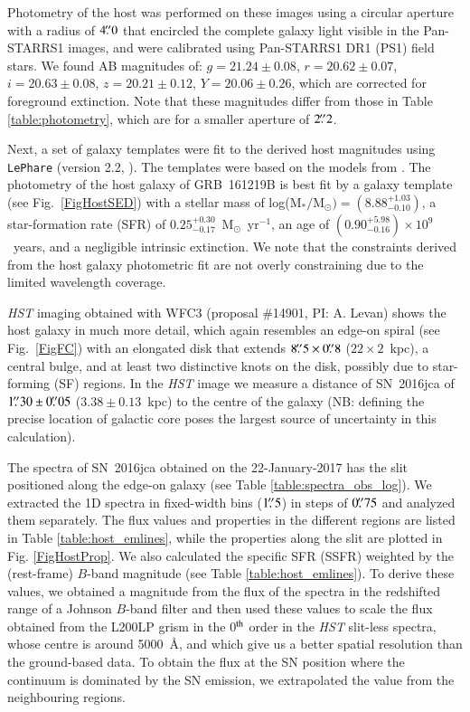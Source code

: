 \documentclass[traditabstract,longauth]{aa}
\begin{document}
Photometry of the host was performed on these images using a circular aperture with a radius of $4\hbox{$.\!\!^{\prime\prime}$}0$ that encircled the complete galaxy light visible in the Pan-STARRS1 images, and were calibrated using Pan-STARRS1 DR1 (PS1) field stars.  We found AB magnitudes of: $g = 21.24\pm0.08$, $r = 20.62\pm0.07$, $i = 20.63\pm0.08$, $z = 20.21\pm0.12$, $Y = 20.06\pm0.26$, which are corrected for foreground extinction.  Note that these magnitudes differ from those in Table \ref{table:photometry}, which are for a smaller aperture of $2\hbox{$.\!\!^{\prime\prime}$}2$.

Next, a set of galaxy templates were fit to the derived host magnitudes using \texttt{LePhare} (version 2.2, \citealt{Arnouts99,Ilbert06}). The templates were based on the models from \citet{Bruzual03}. The photometry of the host galaxy of GRB~161219B is best fit by a galaxy template (see Fig.~\ref{FigHostSED}) with a stellar mass of log(M$_{*}/$M$_{\odot})=(8.88_{-0.10}^{+1.03})$, a star-formation rate (SFR) of $0.25_{-0.17}^{+0.30}$~M$_{\odot}$~yr$^{-1}$, an age of $(0.90_{-0.16}^{+5.98})\times10^9$~years, and a negligible intrinsic extinction. We note that the constraints derived from the host galaxy photometric fit are not overly constraining due to the limited wavelength coverage.

\emph{HST} imaging obtained with WFC3 (proposal \#14901, PI: A. Levan) shows the host galaxy in much more detail, which again resembles an edge-on spiral (see Fig.~\ref{FigFC}) with an elongated disk that extends $8\hbox{$.\!\!^{\prime\prime}$}5\times0\hbox{$.\!\!^{\prime\prime}$}8$ ($22\times2$~kpc), a central bulge, and at least two distinctive knots on the disk, possibly due to star-forming (SF) regions. In the \emph{HST} image we measure a distance of SN~2016jca of $1\hbox{$.\!\!^{\prime\prime}$}30\pm0\hbox{$.\!\!^{\prime\prime}$}05$ ($3.38\pm0.13$~kpc) to the centre of the galaxy (NB: defining the precise location of galactic core poses the largest source of uncertainty in this calculation). 

   
The spectra of SN~2016jca obtained on the 22-January-2017 has the slit positioned along the edge-on galaxy (see Table \ref{table:spectra_obs_log}). We extracted the 1D spectra in fixed-width bins ($1\hbox{$.\!\!^{\prime\prime}$}5$) in steps of $0\hbox{$.\!\!^{\prime\prime}$}75$ and analyzed them separately. The flux values and properties in the different regions are listed in Table \ref{table:host_emlines}, while the properties along the slit are plotted in Fig. \ref{FigHostProp}. We also calculated the specific SFR (SSFR) weighted by the (rest-frame) $B$-band magnitude (see Table \ref{table:host_emlines}). To derive these values, we obtained a magnitude from the flux of the spectra in the redshifted range of a Johnson $B$-band filter and then used these values to scale the flux obtained from the L200LP grism in the 0$^{\rm th}$ order in the \emph{HST} slit-less spectra, whose centre is around 5000~\AA, and which give us a better spatial resolution than the ground-based data. To obtain the flux at the SN position where the continuum is dominated by the SN emission, we extrapolated the value from the neighbouring regions. 
\end{document}
